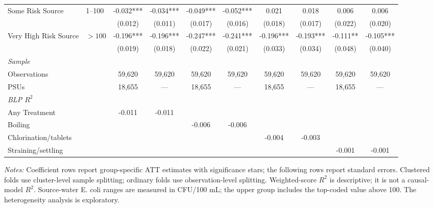 \begin{landscape}
\begin{table}[p]
\begin{adjustbox}{max width=\linewidth, center}
\begin{tabular}{llcccccccc}
Some Risk Source & 1--100 & -0.032*** & -0.034*** & -0.049*** & -0.052*** & 0.021 & 0.018 & 0.006 & 0.006 \\
 &  & (0.012) & (0.011) & (0.017) & (0.016) & (0.018) & (0.017) & (0.022) & (0.020) \\
Very High Risk Source & $>100$ & -0.196*** & -0.196*** & -0.247*** & -0.241*** & -0.196*** & -0.193*** & -0.111** & -0.105*** \\
 &  & (0.019) & (0.018) & (0.022) & (0.021) & (0.033) & (0.034) & (0.048) & (0.040) \\
\multicolumn{10}{l}{\textit{Sample}} \\
\quad Observations &  & 59,620 & 59,620 & 59,620 & 59,620 & 59,620 & 59,620 & 59,620 & 59,620 \\
\quad PSUs &  & 18,655 & --- & 18,655 & --- & 18,655 & --- & 18,655 & --- \\
\multicolumn{10}{l}{\textit{BLP $R^{2}$}} \\
\quad Any Treatment &  & -0.011 & -0.011 &  &  &  &  &  &  \\
\quad Boiling &  &  &  & -0.006 & -0.006 &  &  &  &  \\
\quad Chlorination/tablets &  &  &  &  &  & -0.004 & -0.003 &  &  \\
\quad Straining/settling &  &  &  &  &  &  &  & -0.001 & -0.001 \\
\bottomrule
\end{tabular}
\end{adjustbox}
\par\vspace{3pt}
\begin{minipage}{\linewidth}\footnotesize \textit{Notes:} Coefficient rows report group-specific ATT estimates with significance stars; the following rows report standard errors. Clustered folds use cluster-level sample splitting; ordinary folds use observation-level splitting. Weighted-score $R^2$ is descriptive; it is not a causal-model $R^2$. Source-water E. coli ranges are measured in CFU/100 mL; the upper group includes the top-coded value above 100. The heterogeneity analysis is exploratory.\end{minipage}
\end{table}
\end{landscape}